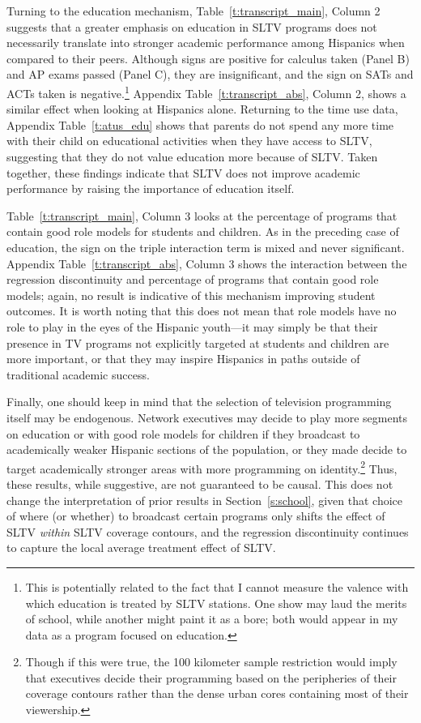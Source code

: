 \documentclass[11pt]{article}
\begin{document}
Turning to the education mechanism, Table~\ref{t:transcript_main}, Column 2 suggests that a greater emphasis on education in SLTV programs does not necessarily translate into stronger academic performance among Hispanics when compared to their peers. Although signs are positive for calculus taken (Panel B) and AP exams passed (Panel C), they are insignificant, and the sign on SATs and ACTs taken is negative.\footnote{ This is potentially related to the fact that I cannot measure the valence with which education is treated by SLTV stations. One show may laud the merits of school, while another might paint it as a bore; both would appear in my data as a program focused on education.} Appendix Table~\ref{t:transcript_abs}, Column 2, shows a similar effect when looking at Hispanics alone. Returning to the time use data, Appendix Table~\ref{t:atus_edu} shows that parents do not spend any more time with their child on educational activities when they have access to SLTV, suggesting that they do not value education more because of SLTV. Taken together, these findings indicate that SLTV does not improve academic performance by raising the importance of education itself.

Table~\ref{t:transcript_main}, Column 3 looks at the percentage of programs that contain good role models for students and children. As in the preceding case of education, the sign on the triple interaction term is mixed and never significant. Appendix Table~\ref{t:transcript_abs}, Column 3 shows the interaction between the regression discontinuity and percentage of programs that contain good role models; again, no result is indicative of this mechanism improving student outcomes. It is worth noting that this does not mean that role models have no role to play in the eyes of the Hispanic youth---it may simply be that their presence in TV programs not explicitly targeted at students and children are more important, or that they may inspire Hispanics in paths outside of traditional academic success.

Finally, one should keep in mind that the selection of television programming itself may be endogenous. Network executives may decide to play more segments on education or with good role models for children if they broadcast to academically weaker Hispanic sections of the population, or they made decide to target academically stronger areas with more programming on identity.\footnote{ Though if this were true, the 100 kilometer sample restriction would imply that executives decide their programming based on the peripheries of their coverage contours rather than the dense urban cores containing most of their viewership.} Thus, these results, while suggestive, are not guaranteed to be causal. This does not change the interpretation of prior results in Section~\ref{s:school}, given that choice of where (or whether) to broadcast certain programs only shifts the effect of SLTV \textit{within} SLTV coverage contours, and the regression discontinuity continues to capture the local average treatment effect of SLTV.    
\end{document}
